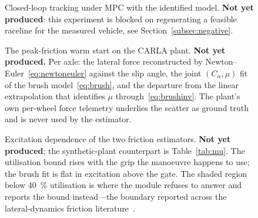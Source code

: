 \begin{figure}[t]
\centering
{}
\caption{Closed-loop tracking under MPC with the identified model.
\textbf{Not yet produced}: this experiment is blocked on regenerating a
feasible raceline for the measured vehicle, see
Section~\ref{subsec:negative}.}
\label{fig:closedloop}
\end{figure}


\begin{figure}[t]
\centering
{}
\caption{The peak-friction warm start on the CARLA plant.
\textbf{Not yet produced.} Per axle: the lateral force reconstructed by
Newton--Euler~\eqref{eq:newtoneuler} against the slip angle, the joint
$(C_{\alpha},\mu)$ fit of the brush model~\eqref{eq:brush}, and the departure
from the linear extrapolation that identifies $\mu$
through~\eqref{eq:brushinv}. The plant's own per-wheel force telemetry
underlies the scatter as ground truth and is never used by the estimator.}
\label{fig:mufit}
\end{figure}

\begin{figure}[t]
\centering
{}
\caption{Excitation dependence of the two friction estimators.
\textbf{Not yet produced}; the synthetic-plant counterpart is
Table~\ref{tab:mu}. The utilisation bound rises with the grip the manoeuvre
happens to use; the brush fit is flat in excitation above the gate. The shaded
region below \SI{40}{\percent} utilisation is where the module refuses to
answer and reports the bound instead---the boundary reported across the
lateral-dynamics friction literature~\cite{acosta2017friction}.}
\label{fig:mugate}
\end{figure}

